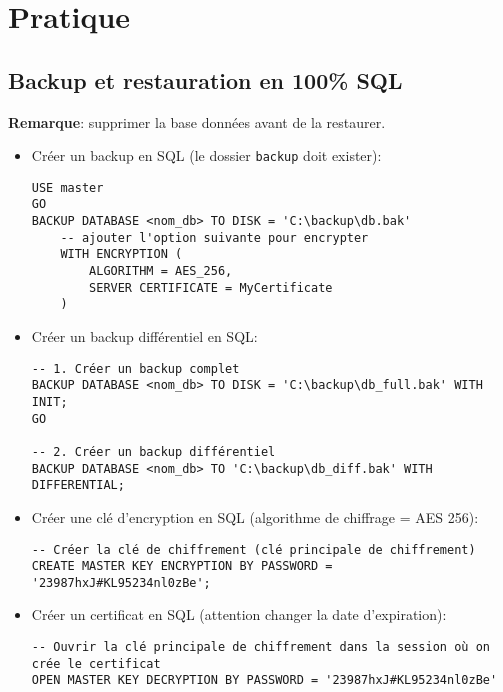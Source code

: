 \documentclass[a4paper]{article}
\begin{document}
\section{Pratique}










\subsection{Backup et restauration en 100\% SQL}





\textbf{Remarque}: supprimer la base données avant de la restaurer.

\begin{itemize}



\item Créer un backup en SQL (le dossier \texttt{backup} doit exister):
\begin{verbatim}
USE master
GO
BACKUP DATABASE <nom_db> TO DISK = 'C:\backup\db.bak'
    -- ajouter l'option suivante pour encrypter
    WITH ENCRYPTION (
        ALGORITHM = AES_256,
        SERVER CERTIFICATE = MyCertificate
    )
\end{verbatim}



\item Créer un backup différentiel en SQL:
\begin{verbatim}
-- 1. Créer un backup complet
BACKUP DATABASE <nom_db> TO DISK = 'C:\backup\db_full.bak' WITH INIT;
GO

-- 2. Créer un backup différentiel
BACKUP DATABASE <nom_db> TO 'C:\backup\db_diff.bak' WITH DIFFERENTIAL;
\end{verbatim}



\item Créer une clé d'encryption en SQL (algorithme de chiffrage = AES 256):
\begin{verbatim}
-- Créer la clé de chiffrement (clé principale de chiffrement)
CREATE MASTER KEY ENCRYPTION BY PASSWORD = '23987hxJ#KL95234nl0zBe';
\end{verbatim}



\item Créer un certificat en SQL (attention changer la date d'expiration):
\begin{verbatim}
-- Ouvrir la clé principale de chiffrement dans la session où on crée le certificat
OPEN MASTER KEY DECRYPTION BY PASSWORD = '23987hxJ#KL95234nl0zBe'


\end{verbatim}
\end{itemize}
\end{document}

